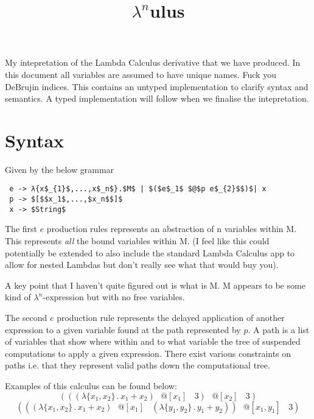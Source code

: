 \documentclass{article}
\title{$\lambda^{n}$ulus}
\date{}
\begin{document}
\maketitle
\vspace{-10mm}
\noindent My intepretation of the Lambda Calculus derivative that we have produced. In this document all variables are assumed to have unique names. Fuck you DeBrujin indices. This contains an untyped implementation to clarify syntax and semantics. A typed implementation will follow when we finalise the intepretation.
\section{Syntax}
Given by the below grammar

\begin{lstlisting}
 e -> λ{x$_{1}$,...,x$_n$}.$M$ | $($e$_1$ $@$p e$_{2}$$)$| x
 p -> $[$$x_1$,...,$x_n$$]$
 x -> $String$
\end{lstlisting}

\noindent The first $e$ production rules represents an abstraction of n variables within M. This represents \emph{all} the bound variables within M. (I feel like this could potentially be extended to also include the standard Lambda Calculus app to allow for nested Lambdas but don't really see what that would buy you).

\par
\noindent A key point that I haven't quite figured out is what is M. M appears to be some kind of $\lambda^n$-expression but with no free variables.
\par
\noindent The second $e$ production rule represents the delayed application of another expression to a given variable found at the path represented by $p$. A path is a list of variables that show where within and to what variable the tree of suspended computations to apply a given expression. There exist various constraints on paths i.e. that they represent valid paths down the computational tree.
\par
\noindent Examples of this calculus can be found below:
\begin{equation}
    (((\lambda\{x_1, x_2\}\,.\, x_1 + x_2) \>\>\>@[x_1] \>\>\>\>3) \>\>\>@[x_2] \>\>\>\>3)
\end{equation}
\begin{equation}
    (((\lambda\{x_1, x_2\}\,.\, x_1 + x_2) \>\>\>@[x_1] \>\>\>\>(\lambda\{y_1, y_2\}\,.\, y_1 + y_2)) \>\>\>@[x_1, y_1] \>\>\>\>3)
\end{equation}
\end{document}

